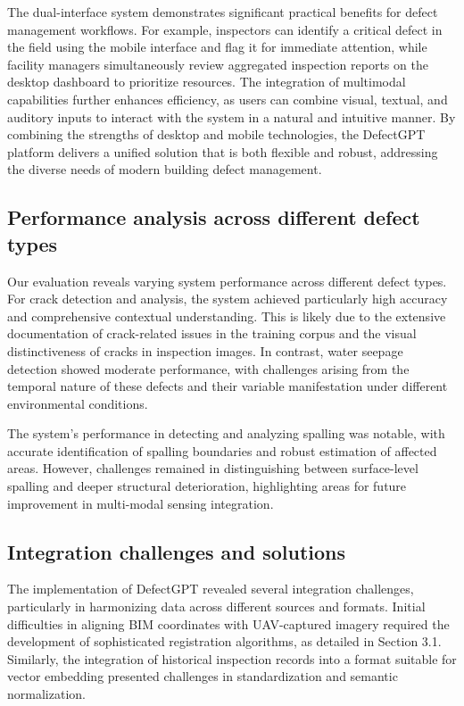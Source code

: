 \documentclass[a4paper,fleqn]{cas-sc}
\begin{document}
The dual-interface system demonstrates significant practical benefits for defect management workflows. For example, inspectors can identify a critical defect in the field using the mobile interface and flag it for immediate attention, while facility managers simultaneously review aggregated inspection reports on the desktop dashboard to prioritize resources. The integration of multimodal capabilities further enhances efficiency, as users can combine visual, textual, and auditory inputs to interact with the system in a natural and intuitive manner. By combining the strengths of desktop and mobile technologies, the DefectGPT platform delivers a unified solution that is both flexible and robust, addressing the diverse needs of modern building defect management.

\subsection{Performance analysis across different defect types}

Our evaluation reveals varying system performance across different defect types. For crack detection and analysis, the system achieved particularly high accuracy and comprehensive contextual understanding. This is likely due to the extensive documentation of crack-related issues in the training corpus and the visual distinctiveness of cracks in inspection images. In contrast, water seepage detection showed moderate performance, with challenges arising from the temporal nature of these defects and their variable manifestation under different environmental conditions.

The system's performance in detecting and analyzing spalling was notable, with accurate identification of spalling boundaries and robust estimation of affected areas. However, challenges remained in distinguishing between surface-level spalling and deeper structural deterioration, highlighting areas for future improvement in multi-modal sensing integration.

\subsection{Integration challenges and solutions}

The implementation of DefectGPT revealed several integration challenges, particularly in harmonizing data across different sources and formats. Initial difficulties in aligning BIM coordinates with UAV-captured imagery required the development of sophisticated registration algorithms, as detailed in Section 3.1. Similarly, the integration of historical inspection records into a format suitable for vector embedding presented challenges in standardization and semantic normalization.
\end{document}
